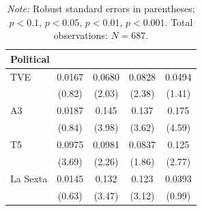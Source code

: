 \documentclass[12pt]{article}
\begin{document}
\begin{table}[htbp]
\begin{tabular}{lcccc}
			\multicolumn{5}{l}{\textbf{Political}}\\
			\hline
			TVE            &  0.0167         &  0.0680\sym{*}   &  0.0828\sym{*}  &  0.0494         \\
			&  (0.82)         &  (2.03)         &  (2.38)         &  (1.41)         \\
			A3             &  0.0187         &  0.145\sym{***}  &  0.137\sym{***} &  0.175\sym{***} \\
			&  (0.84)         &  (3.98)         &  (3.62)         &  (4.59)         \\
			T5             &  0.0975\sym{***}&  0.0981\sym{*}   &  0.0837 &  0.125\sym{**}  \\
			&  (3.69)         &  (2.26)         &  (1.86)         &  (2.77)         \\
			La Sexta       &  0.0145         &  0.132\sym{***}  &  0.123\sym{**}  &  0.0393         \\
			&  (0.63)         &  (3.47)         &  (3.12)         &  (0.99)         \\
			\hline\hline
		\end{tabular}
		\caption*{\scriptsize\emph{Note:} Robust standard errors in parentheses; 
			 $p<0.1$, \sym{*} $p<0.05$, \sym{**} $p<0.01$, \sym{***} $p<0.001$. 
			Total observations: $N=687$.}
	\end{table}
	
	
	
	
	
	
	
	
	
\end{document}
